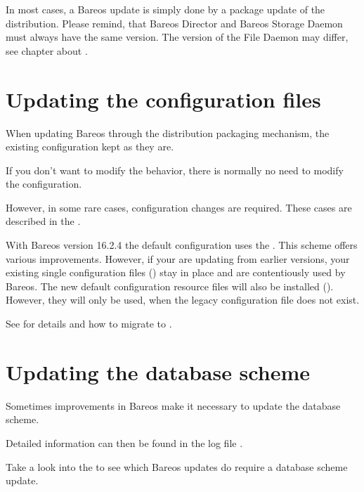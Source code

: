 
In most cases, a Bareos update is simply done by a package update of the distribution.
Please remind, that Bareos Director and Bareos Storage Daemon must always have the same version.
The version of the File Daemon may differ, see chapter about .

\section{Updating the configuration files}

When updating Bareos through the distribution packaging mechanism,
the existing configuration kept as they are.

If you don't want to modify the behavior,
there is normally no need to modify the configuration.

However, in some rare cases, configuration changes are required.
These cases are described in the .

With Bareos version 16.2.4 the default configuration uses the .
This scheme offers various improvements. However, if your are updating from earlier versions,
your existing single configuration files () stay in place and are contentiously used by Bareos.
The new default configuration resource files will also be installed ().
However, they will only be used, when the legacy configuration file does not exist.

See  for details and how to migrate to .


\section{Updating the database scheme}

Sometimes improvements in Bareos make it necessary to update the database scheme.


Detailed information can then be found in the log file \logfileUnix.

Take a look into the  to see which Bareos updates do require a database scheme update.




